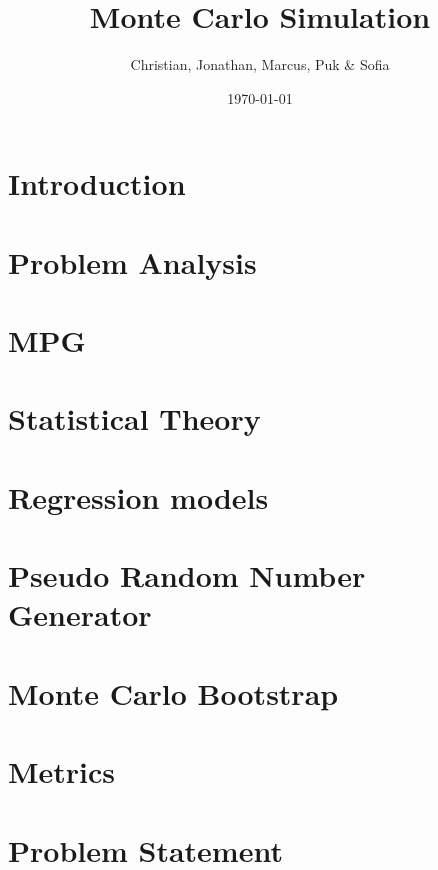 \documentclass{article}
\title{Monte Carlo Simulation}
\author{Christian, Jonathan, Marcus, Puk \& Sofia }
\date{\today}
\begin{document}
	
	
	\setcounter{section}{0}
	\maketitle
	\newpage
	\tableofcontents
	\newpage
	
	\section{Introduction}
	
	\newpage
	
	\section{Problem Analysis}
	
	\newpage
	
	\section{MPG}
	
	\newpage
	
	\section{Statistical Theory}
	
	\newpage
	
	\section{Regression models}
 	
	\newpage
	
	
 	\section{Pseudo Random Number Generator}
	
	\newpage
	
	\section{Monte Carlo Bootstrap}
	
	\newpage
	\section{Metrics}
	
	\newpage

	
	\section{Problem Statement}
	
	\newpage
%	
	
\end{document}
